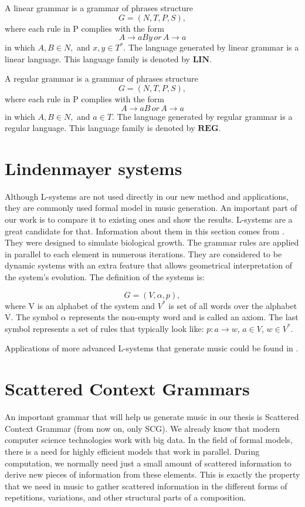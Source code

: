 \begin{definition}
\label{Def18}
A linear grammar is a grammar of phrases structure $$ G = (N, T, P, S),$$ where each rule in P complies with the form
$$ A \rightarrow aBy \, or \, A \rightarrow a$$ in which $A, B \in N,$ and $x,y \in T^*$. The language generated by linear grammar is a linear language. This language family is denoted by \(\mathbf{LIN}\).
\end{definition}

\begin{definition}
\label{Def19}
A regular grammar is a grammar of phrases structure $$ G = (N, T, P, S),$$ where each rule in P complies with the form
$$ A \rightarrow aB \, or \, A \rightarrow a$$ in which $A, B \in N,$ and $a \in T$. The language generated by regular grammar is a regular language. This language family is denoted by \(\mathbf{REG}\).
\end{definition}

\section{Lindenmayer systems}
Although L-systems are not used directly in our new method and applications, they are commonly used formal model in music generation. An important part of our work is to compare it to existing ones and show the results. L-systems are a great candidate for that. Information about them in this section comes from \cite{mishra2007system}. They were designed to simulate biological growth. The grammar rules are applied in parallel to each element in numerous iterations. They are considered to be dynamic systems with an extra feature that allows geometrical interpretation of the system's evolution. The definition of the systems is:

\begin{definition}
\label{Def20}
$$G = (V, \alpha, p),$$ where V is an alphabet of the system and $V^*$ is set of all words over the alphabet V. The symbol $\alpha$ represents the non-empty word and is called an axiom. The last symbol represents a set of rules that typically look like: $p : a \rightarrow w$, $a \in V$, $w \in V^*$.
\end{definition}

Applications of more advanced L-systems that generate music could be found in \cite{lsystemsmix}.
\section{Scattered Context Grammars}
An important grammar that will help us generate music in our thesis is Scattered Context Grammar (from now on, only SCG). We already know that modern computer science technologies work with big data. In the field of formal models, there is a need for highly efficient models that work in parallel. During computation, we normally need just a small amount of scattered information to derive new pieces of information from these elements. This is exactly the property that we need in music to gather scattered information in the different forms of repetitions, variations, and other structural parts of a composition.

